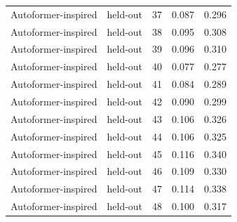 \begin{tabular}{llrrr}
Autoformer-inspired & held-out & 37 & 0.087 & 0.296 \\
Autoformer-inspired & held-out & 38 & 0.095 & 0.308 \\
Autoformer-inspired & held-out & 39 & 0.096 & 0.310 \\
Autoformer-inspired & held-out & 40 & 0.077 & 0.277 \\
Autoformer-inspired & held-out & 41 & 0.084 & 0.289 \\
Autoformer-inspired & held-out & 42 & 0.090 & 0.299 \\
Autoformer-inspired & held-out & 43 & 0.106 & 0.326 \\
Autoformer-inspired & held-out & 44 & 0.106 & 0.325 \\
Autoformer-inspired & held-out & 45 & 0.116 & 0.340 \\
Autoformer-inspired & held-out & 46 & 0.109 & 0.330 \\
Autoformer-inspired & held-out & 47 & 0.114 & 0.338 \\
Autoformer-inspired & held-out & 48 & 0.100 & 0.317 \\
\bottomrule
\end{tabular}
